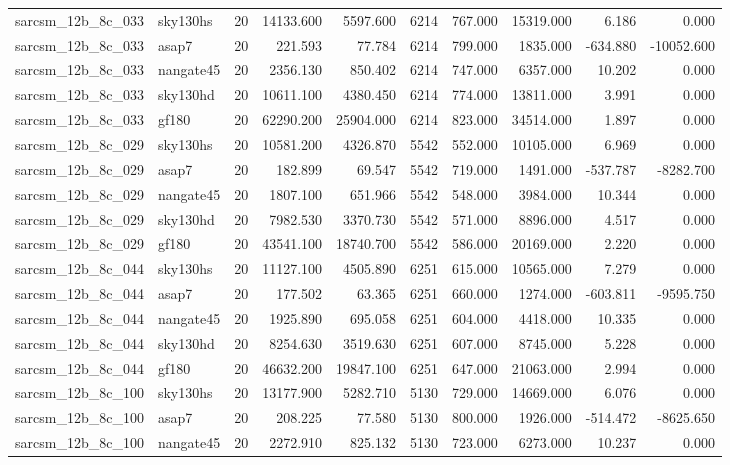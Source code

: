 \begin{tabular}{llrrrrrrrr}
sarcsm\_12b\_8c\_033 & sky130hs & 20 & 14133.600 & 5597.600 & 6214 & 767.000 & 15319.000 & 6.186 & 0.000 \\
sarcsm\_12b\_8c\_033 & asap7 & 20 & 221.593 & 77.784 & 6214 & 799.000 & 1835.000 & -634.880 & -10052.600 \\
sarcsm\_12b\_8c\_033 & nangate45 & 20 & 2356.130 & 850.402 & 6214 & 747.000 & 6357.000 & 10.202 & 0.000 \\
sarcsm\_12b\_8c\_033 & sky130hd & 20 & 10611.100 & 4380.450 & 6214 & 774.000 & 13811.000 & 3.991 & 0.000 \\
sarcsm\_12b\_8c\_033 & gf180 & 20 & 62290.200 & 25904.000 & 6214 & 823.000 & 34514.000 & 1.897 & 0.000 \\
sarcsm\_12b\_8c\_029 & sky130hs & 20 & 10581.200 & 4326.870 & 5542 & 552.000 & 10105.000 & 6.969 & 0.000 \\
sarcsm\_12b\_8c\_029 & asap7 & 20 & 182.899 & 69.547 & 5542 & 719.000 & 1491.000 & -537.787 & -8282.700 \\
sarcsm\_12b\_8c\_029 & nangate45 & 20 & 1807.100 & 651.966 & 5542 & 548.000 & 3984.000 & 10.344 & 0.000 \\
sarcsm\_12b\_8c\_029 & sky130hd & 20 & 7982.530 & 3370.730 & 5542 & 571.000 & 8896.000 & 4.517 & 0.000 \\
sarcsm\_12b\_8c\_029 & gf180 & 20 & 43541.100 & 18740.700 & 5542 & 586.000 & 20169.000 & 2.220 & 0.000 \\
sarcsm\_12b\_8c\_044 & sky130hs & 20 & 11127.100 & 4505.890 & 6251 & 615.000 & 10565.000 & 7.279 & 0.000 \\
sarcsm\_12b\_8c\_044 & asap7 & 20 & 177.502 & 63.365 & 6251 & 660.000 & 1274.000 & -603.811 & -9595.750 \\
sarcsm\_12b\_8c\_044 & nangate45 & 20 & 1925.890 & 695.058 & 6251 & 604.000 & 4418.000 & 10.335 & 0.000 \\
sarcsm\_12b\_8c\_044 & sky130hd & 20 & 8254.630 & 3519.630 & 6251 & 607.000 & 8745.000 & 5.228 & 0.000 \\
sarcsm\_12b\_8c\_044 & gf180 & 20 & 46632.200 & 19847.100 & 6251 & 647.000 & 21063.000 & 2.994 & 0.000 \\
sarcsm\_12b\_8c\_100 & sky130hs & 20 & 13177.900 & 5282.710 & 5130 & 729.000 & 14669.000 & 6.076 & 0.000 \\
sarcsm\_12b\_8c\_100 & asap7 & 20 & 208.225 & 77.580 & 5130 & 800.000 & 1926.000 & -514.472 & -8625.650 \\
sarcsm\_12b\_8c\_100 & nangate45 & 20 & 2272.910 & 825.132 & 5130 & 723.000 & 6273.000 & 10.237 & 0.000 \\

\end{tabular}
